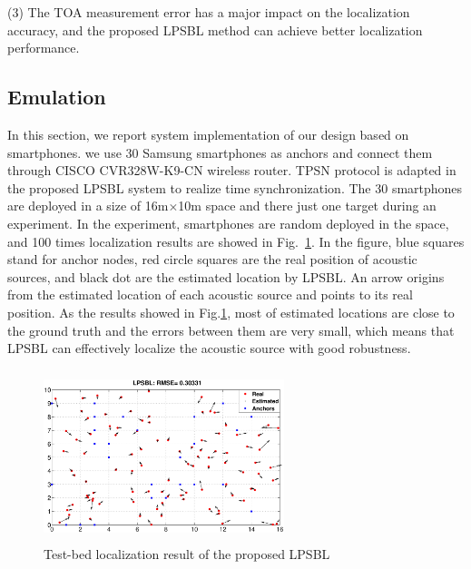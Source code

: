  (3) The TOA measurement error has a major impact on the localization accuracy, and the proposed LPSBL method can achieve better localization performance.



\subsection{Emulation}


In this section, we report system implementation of our design based on smartphones.
we use 30 Samsung smartphones as anchors and connect them through CISCO CVR328W-K9-CN wireless router. 
TPSN protocol is adapted in the proposed LPSBL system to realize time synchronization.
The 30 smartphones are deployed in a size of 16m$\times$10m space and there just one target during an experiment.
In the experiment, smartphones are random deployed in the space, and 100 times localization results are showed in Fig.~\ref{fig7}. 
In the figure, blue squares stand for anchor
nodes, red circle squares are the real position of acoustic sources, and black dot are the estimated location by LPSBL. 
An arrow origins from the estimated location of each acoustic source and points to its real position. 
As the results showed in Fig.\ref{fig7}, most of estimated locations are close to the ground truth and the errors between them are very small,
which means that LPSBL can effectively localize the acoustic source with good robustness.
  \begin{figure}[htb]
			    \vspace{-12mm}
            \includegraphics[height=5.0cm,width=7.0cm]{image/fig7.eps}
            \vspace{12mm}
            \caption{Test-bed localization result of the proposed LPSBL}
             \vspace{-5mm}
             \label{fig7}
        \end{figure}

